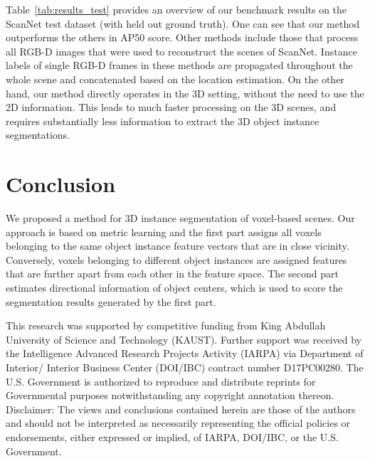 \documentclass[10pt,twocolumn,letterpaper]{article}
\newcommand{\boldparagraph}[1]{\vspace{0.5em}\noindent{\bf #1} }
\begin{document}
Table~\ref{tab:results_test} provides an overview of our benchmark results on the ScanNet test dataset (with held out ground truth). One can see that our method outperforms the others in AP50 score. Other methods include those that process all RGB-D images that were used to reconstruct the scenes of ScanNet. Instance labels of single RGB-D frames in these methods are propagated throughout the whole scene and concatenated based on the location estimation. On the other hand, our method directly operates in the 3D setting, without the need to use the 2D information. This leads to much faster processing on the 3D scenes, and requires substantially less information to extract the 3D object instance segmentations.






 \section{Conclusion}
We proposed a method for 3D instance segmentation of voxel-based scenes.
Our approach is based on metric learning and the first part assigns all voxels belonging to the same object instance feature vectors that are in close vicinity. 
Conversely, voxels belonging to different object instances are assigned  features that are further apart from each other in the feature space. 
The second part estimates directional information of object centers, which is used to score the segmentation results generated by the first part.


{\small
\vspace{0.5em}
\boldparagraph{Acknowledgments.}
This research was supported by competitive funding from King Abdullah University of Science and Technology (KAUST). Further support was received by the Intelligence Advanced Research Projects Activity (IARPA) via Department of Interior/ Interior Business Center (DOI/IBC) contract number D17PC00280.
The U.S. Government is authorized to reproduce and distribute reprints for Governmental purposes notwithstanding any copyright annotation thereon. Disclaimer: The views and conclusions contained herein are those of the authors and should not be interpreted as necessarily representing the official policies or endorsements, either expressed or implied, of IARPA, DOI/IBC, or the U.S. Government.
\par
} 


{\small


}
\end{document}
